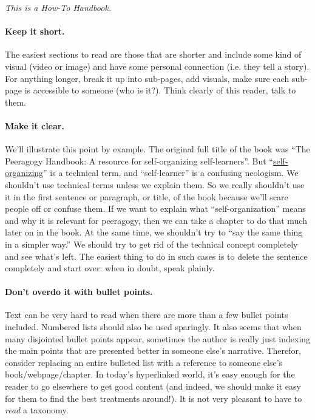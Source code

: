\begin{center}
\emph{This is a How-To Handbook.}
\end{center}

\paragraph{Keep it short.}
The easiest sections to read are those that are shorter and include some
kind of visual (video or image) and have some personal connection (i.e.
they tell a story). For anything longer, break it up into sub-pages, add
visuals, make sure each sub-page is accessible to someone (who is it?).
Think clearly of this reader, talk to them.

\paragraph{Make it clear.}

We'll illustrate this point by example. The original full title of the
book was ``The Peeragogy Handbook: A resource for self-organizing
self-learners''. But
``\href{http://en.wikipedia.org/wiki/Self-organization}{self-organizing}''
is a technical term, and ``self-learner'' is a confusing neologism. 
%
We shouldn't use technical terms unless we explain them. So we really
shouldn't use it in the first sentence or paragraph, or title, of the
book because we'll scare people off or confuse them. If we want to
explain what ``self-organization'' means and why it is relevant for
peeragogy, then we can take a chapter to do that much later on in the
book.
%
At the same time, we shouldn't try to ``say the same thing in a
simpler way.'' We should try to get rid of the technical concept
completely and see what's left. The easiest thing to do in such cases
is to delete the sentence completely and start over: when in doubt,
speak plainly.

\paragraph{Don't overdo it with bullet points.}

Text can be very hard to read when there are more than a few bullet
points included. Numbered lists should also be used sparingly. It also
seems that when many disjointed bullet points appear, sometimes the
author is really just indexing the main points that are presented better
in someone else's narrative. Therefor, consider replacing an entire
bulleted list with a reference to someone else's book/webpage/chapter.
In today's hyperlinked world, it's easy enough for the reader to go
elsewhere to get good content (and indeed, we should make it easy for
them to find the best treatments around!). It is not very pleasant to
have to \emph{read} a taxonomy.

